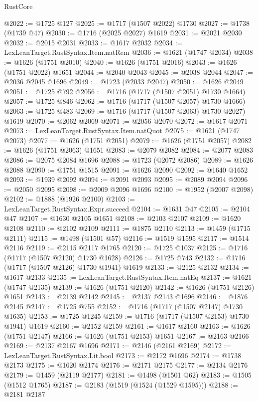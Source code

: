 \begin{lexlean}{RustCore}
\begin{coremodule}
@2022 := @1725 @127
@2025 := @1717 (@1507 @2022) @1730
@2027 := @1738 (@1739 @47)
@2030 := @1716 (@2025 @2027) @1619
@2031 := @2021 @2030
@2032 := @2015 @2031
@2033 := @1617 @2032
@2034 := LexLeanTarget.RustSyntax.Item.natRem
@2036 := @1621 (@1747 @2034)
@2038 := @1626 (@1751 @2010)
@2040 := @1626 (@1751 @2016)
@2043 := @1626 (@1751 @2022) @1651
@2044 := @2040 @2043
@2045 := @2038 @2044
@2047 := @2036 @2045 @1696
@2049 := @1723 (@2033 @2047)
@2050 := @1626 @2049
@2051 := @1725 @792
@2056 := @1716 (@1717 (@1507 @2051) @1730 @1664)
@2057 := @1725 @846
@2062 := @1716 (@1717 (@1507 @2057) @1730 @1666)
@2063 := @1725 @483
@2069 := @1716 (@1717 (@1507 @2063) @1730 @2027) @1619
@2070 := @2062 @2069
@2071 := @2056 @2070
@2072 := @1617 @2071
@2073 := LexLeanTarget.RustSyntax.Item.natQuot
@2075 := @1621 (@1747 @2073)
@2077 := @1626 (@1751 @2051)
@2079 := @1626 (@1751 @2057)
@2082 := @1626 (@1751 @2063) @1651
@2083 := @2079 @2082
@2084 := @2077 @2083
@2086 := @2075 @2084 @1696
@2088 := @1723 (@2072 @2086)
@2089 := @1626 @2088
@2090 := @1751 @1515
@2091 := @1626 @2090
@2092 := @1640 @1652
@2093 := @1939 @2092
@2094 := @2091 @2093
@2095 := @2089 @2094
@2096 := @2050 @2095
@2098 := @2009 @2096 @1696
@2100 := @1952 (@2007 @2098)
@2102 := @1888 (@1926 @2100)
@2103 := LexLeanTarget.RustSyntax.Expr.succeed
@2104 := @1631 @47
@2105 := @2104 @47
@2107 := @1630 @2105 @1651
@2108 := @2103 @2107
@2109 := @1620 @2108
@2110 := @2102 @2109
@2111 := @1875 @2110
@2113 := @1459 (@1715 @2111)
@2115 := @1498 (@1501 @57)
@2116 := @1519 @1595
@2117 := @1514 @2116
@2119 := @2115 @2117 @1765
@2120 := @1725 @1037
@2125 := @1716 (@1717 (@1507 @2120) @1730 @1628)
@2126 := @1725 @743
@2132 := @1716 (@1717 (@1507 @2126) @1730 @1941) @1619
@2133 := @2125 @2132
@2134 := @1617 @2133
@2135 := LexLeanTarget.RustSyntax.Item.natEq
@2137 := @1621 (@1747 @2135)
@2139 := @1626 (@1751 @2120)
@2142 := @1626 (@1751 @2126) @1651
@2143 := @2139 @2142
@2145 := @2137 @2143 @1696
@2146 := @1876 @2145
@2147 := @1725 @755
@2152 := @1716 (@1717 (@1507 @2147) @1730 @1635)
@2153 := @1725 @1245
@2159 := @1716 (@1717 (@1507 @2153) @1730 @1941) @1619
@2160 := @2152 @2159
@2161 := @1617 @2160
@2163 := @1626 (@1751 @2147)
@2166 := @1626 (@1751 @2153) @1651
@2167 := @2163 @2166
@2169 := @2137 @2167 @1696
@2171 := @2146 (@2161 @2169)
@2172 := LexLeanTarget.RustSyntax.Lit.bool
@2173 := @2172 @1696
@2174 := @1738 @2173
@2175 := @1620 @2174
@2176 := @2171 @2175
@2177 := @2134 @2176
@2179 := @1459 (@2119 @2177)
@2181 := @1498 (@1501 @62)
@2183 := @1505 (@1512 @1765)
@2187 := @2183 (@1519 (@1524 (@1529 @1595)))
@2188 := @2181 @2187

\end{coremodule}
\end{lexlean}
